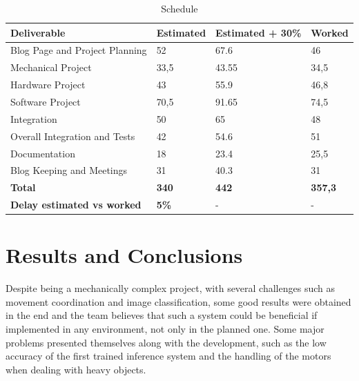 \documentclass[a4paper,11pt]{article}
\begin{document}
\begin{table}[H]
  \small
  \caption{\small{Schedule}}
  \begin{center}
    \begin{tabular}{|l|l|l|l|}
      \hline
      \textbf{Deliverable}               & \textbf{Estimated} & \textbf{Estimated + 30\%} & \textbf{Worked} \\ \hline
      Blog Page and Project Planning     & 52                 & 67.6                      & 46              \\ \hline
      Mechanical Project                 & 33,5               & 43.55                     & 34,5            \\ \hline
      Hardware Project                   & 43                 & 55.9                      & 46,8            \\ \hline
      Software Project                   & 70,5               & 91.65                     & 74,5            \\ \hline
      Integration                        & 50                 & 65                        & 48              \\ \hline
      Overall Integration and Tests      & 42                 & 54.6                      & 51              \\ \hline
      Documentation                      & 18                 & 23.4                      & 25,5            \\ \hline
      Blog Keeping and Meetings          & 31                 & 40.3                      & 31              \\ \hline
      \textbf{Total}                     & \textbf{340}       & \textbf{442}              & \textbf{357,3}  \\ \hline
      \textbf{Delay estimated vs worked} & \textbf{5\%}       & -                         & -               \\ \hline
    \end{tabular}
  \end{center}
  \label{tab:schedule}
\end{table}

\section{Results and Conclusions}
Despite being a mechanically complex project, with several challenges such as movement coordination and image classification, some good results were obtained in the end and the team believes that such a system could be beneficial if implemented in any environment, not only in the planned one. Some major problems presented themselves along with the development, such as the low accuracy of the first trained inference system and the handling of the motors when dealing with heavy objects.
\end{document}

